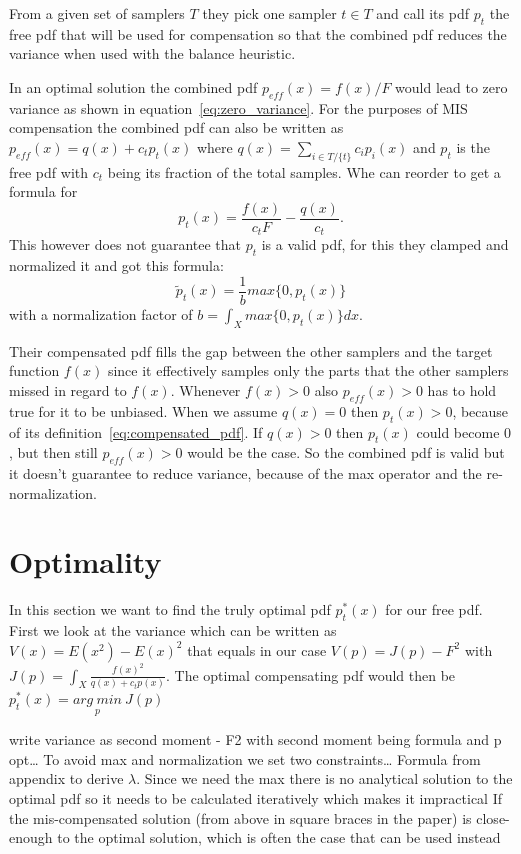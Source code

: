 From a given set of samplers $ T $ they pick one sampler $ t \in T $ and call its pdf $ p_t $ the free pdf that will be used for compensation
so that the combined pdf reduces the variance when used with the balance heuristic.

In an optimal solution the combined pdf $ p_{eff}(x) = f(x)/F $ would lead to zero variance as shown in equation~\ref{eq:zero_variance}.
For the purposes of MIS compensation the combined pdf can also be written as $ p_{eff}(x) = q(x) + c_t p_t(x) $ where $ q(x) = \sum_{i \in T/\{t\}} c_i p_i(x) $
and $ p_t $ is the free pdf with $ c_t $ being its fraction of the total samples.
Whe can reorder to get a formula for
\begin{equation}
    \label{eq:compensated_pdf}
    p_t(x) = \frac{f(x)}{c_t F} - \frac{q(x)}{c_t}.
\end{equation}
This however does not guarantee that $ p_t $ is a valid pdf,
for this they clamped and normalized it and got this formula: $$ \tilde{p}_t(x) = \frac{1}{b} max\{0, p_t(x)\} $$ with a normalization factor of $ b = \int_X max\{0, p_t(x)\} dx $.

Their compensated pdf fills the gap between the other samplers and the target function $ f(x) $
since it effectively samples only the parts that the other samplers missed in regard to $ f(x) $.
Whenever $ f(x) > 0 $ also $ p_{eff}(x) > 0 $ has to hold true for it to be unbiased.
When we assume $ q(x) = 0 $ then $ p_t(x) > 0 $, because of its definition~\ref{eq:compensated_pdf}.
If $ q(x) > 0 $ then $ p_t(x) $ could become $ 0 $, but then still $ p_{eff}(x) > 0 $ would be the case.
So the combined pdf is valid but it doesn't guarantee to reduce variance, because of the max operator and the re-normalization.


\section{Optimality}
\label{sec:misc_optimality}
In this section we want to find the truly optimal pdf $ p_t^*(x) $ for our free pdf.
First we look at the variance
which can be written as $ V(x) = E(x^2) - E(x)^2 $ that equals in our case $ V(p) = J(p) - F^2 $ with $ J(p) = \int_X \frac{f(x)^2}{q(x) + c_t p(x)} $.
The optimal compensating pdf would then be $ p_t^*(x) = \underset{p}{arg~min}~J(p) $


write variance as second moment - F2 with second moment being formula and p opt\dots
To avoid max and normalization we set two constraints\dots
Formula from appendix to derive $ \lambda $.
Since we need the max there is no analytical solution to the optimal pdf so it needs to be calculated iteratively which makes it impractical
If the mis-compensated solution (from above in square braces in the paper) is close-enough to the optimal solution, which is often the case that can be used instead

